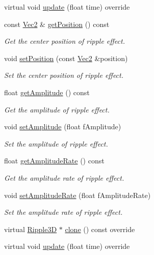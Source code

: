 \begin{DoxyCompactItemize}
\item 
virtual void \hyperlink{classRipple3D_a99d5d92c7394aa596fbba3008096d72f}{update} (float time) override
\item 
const \hyperlink{classVec2}{Vec2} \& \hyperlink{classRipple3D_aea226ed8d1d72fa88cd5643a75c5e404}{get\+Position} () const
\begin{DoxyCompactList}\small\item\em Get the center position of ripple effect. \end{DoxyCompactList}\item 
void \hyperlink{classRipple3D_af80c68000b6bb6f2e1d8f78cd8712ef7}{set\+Position} (const \hyperlink{classVec2}{Vec2} \&position)
\begin{DoxyCompactList}\small\item\em Set the center position of ripple effect. \end{DoxyCompactList}\item 
float \hyperlink{classRipple3D_ac9565db28bedd7b2f71a2fb7ac49e04f}{get\+Amplitude} () const
\begin{DoxyCompactList}\small\item\em Get the amplitude of ripple effect. \end{DoxyCompactList}\item 
void \hyperlink{classRipple3D_ad31bc9587e1562638c3ce843376fb68b}{set\+Amplitude} (float f\+Amplitude)
\begin{DoxyCompactList}\small\item\em Set the amplitude of ripple effect. \end{DoxyCompactList}\item 
float \hyperlink{classRipple3D_a721189b2c0cca07f653f4a625ef8a2c1}{get\+Amplitude\+Rate} () const
\begin{DoxyCompactList}\small\item\em Get the amplitude rate of ripple effect. \end{DoxyCompactList}\item 
void \hyperlink{classRipple3D_a328b21e3d9d03027cd9bcb7873b77b2d}{set\+Amplitude\+Rate} (float f\+Amplitude\+Rate)
\begin{DoxyCompactList}\small\item\em Set the amplitude rate of ripple effect. \end{DoxyCompactList}\item 
virtual \hyperlink{classRipple3D}{Ripple3D} $\ast$ \hyperlink{classRipple3D_a79b0876958a8e7403d8be5f6e2adfd24}{clone} () const override
\item 
virtual void \hyperlink{classRipple3D_a4e6defdbc62289aa7009987464878a1d}{update} (float time) override
\end{DoxyCompactItemize}
